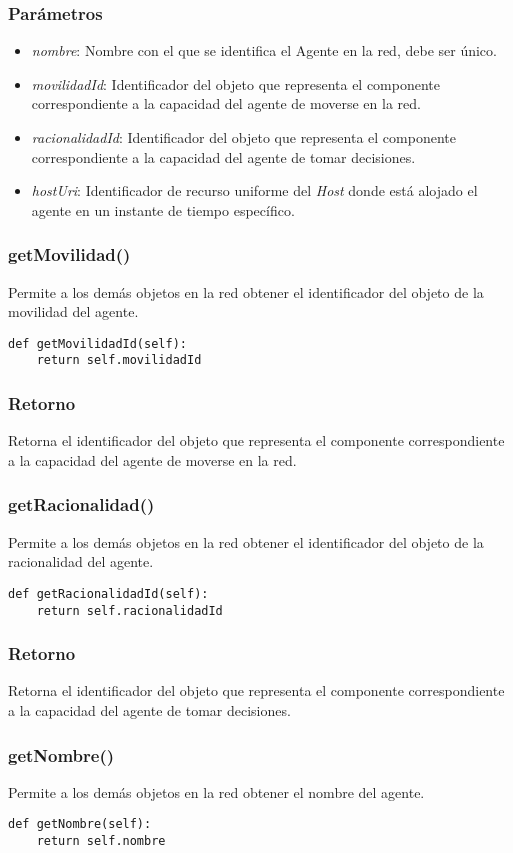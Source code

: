 \documentclass{article}
\begin{document}
\subsubsection*{Parámetros}
\begin{itemize}
\item \textit{nombre}: Nombre con el que se identifica el Agente en la red, debe ser único.
\item \textit{movilidadId}: Identificador del objeto que representa el componente correspondiente a la capacidad del agente de moverse en la red.
\item \textit{racionalidadId}: Identificador del objeto que representa el componente correspondiente a la capacidad del agente de tomar decisiones.
\item \textit{hostUri}: Identificador de recurso uniforme del \textit{Host} donde está alojado el agente en un instante de tiempo específico.
\end{itemize}
\subsubsection{\textbf{getMovilidad}()}
Permite a los demás objetos en la red obtener el identificador del objeto de la movilidad del agente.
\begin{lstlisting}
def getMovilidadId(self):
	return self.movilidadId
\end{lstlisting}
\subsubsection*{Retorno}
Retorna el identificador del objeto que representa el componente correspondiente a la capacidad del agente de moverse en la red.
\subsubsection{\textbf{getRacionalidad}()}
Permite a los demás objetos en la red obtener el identificador del objeto de la racionalidad del agente.
\begin{lstlisting}
def getRacionalidadId(self):
	return self.racionalidadId
\end{lstlisting}
\subsubsection*{Retorno}
Retorna el identificador del objeto que representa el componente correspondiente a la capacidad del agente de tomar decisiones.
\subsubsection{\textbf{getNombre}()}
Permite a los demás objetos en la red obtener el nombre del agente.
\begin{lstlisting}
def getNombre(self):
	return self.nombre
\end{lstlisting}
\end{document}
